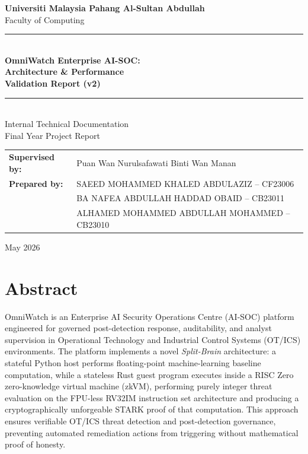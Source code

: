 \documentclass[12pt,a4paper]{article}
\begin{document}
\begin{titlepage}
\centering
\vspace*{1.5cm}

{\large\textbf{Universiti Malaysia Pahang Al-Sultan Abdullah}}\\[4pt]
{\large Faculty of Computing}\\[2cm]

\rule{\textwidth}{1pt}\\[0.6cm]
{\LARGE\bfseries OmniWatch Enterprise AI-SOC:\\[6pt]
Architecture \& Performance\\[6pt]
Validation Report (v2)}\\[0.4cm]
\rule{\textwidth}{1pt}\\[1cm]

{\large Internal Technical Documentation}\\[0.4cm]
{\large Final Year Project Report}\\[2cm]

\begin{tabular}{ll}
\textbf{Supervised by:} & Puan Wan Nurulsafawati Binti Wan Manan \\[12pt]
\textbf{Prepared by:}   & SAEED MOHAMMED KHALED ABDULAZIZ -- CF23006 \\
                         & BA NAFEA ABDULLAH HADDAD OBAID -- CB23011 \\
                         & ALHAMED MOHAMMED ABDULLAH MOHAMMED -- CB23010 \\
\end{tabular}

\vfill
{\large May 2026}

\end{titlepage}

\section*{Abstract}

OmniWatch is an Enterprise AI Security Operations Centre (AI-SOC) platform
engineered for governed post-detection response, auditability, and analyst
supervision in Operational Technology and Industrial Control Systems (OT/ICS)
environments. The platform implements a novel \emph{Split-Brain} architecture:
a stateful Python host performs floating-point machine-learning baseline
computation, while a stateless Rust guest program executes inside a
RISC Zero zero-knowledge virtual machine (zkVM), performing purely
integer threat evaluation on the FPU-less RV32IM instruction set
architecture and producing a cryptographically unforgeable STARK proof
of that computation. This approach ensures verifiable OT/ICS threat detection
and post-detection governance, preventing automated remediation actions from
triggering without mathematical proof of honesty.
\end{document}

